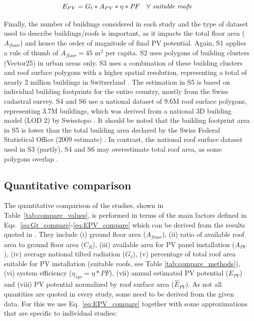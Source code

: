 \begin{equation}
\label{eq:EPV_compare}
    E_{PV} = G_t * A_{PV} * \eta * \mathit{PF} \quad \forall \ \text{\textit{suitable roofs}}
\end{equation}

Finally, the number of buildings considered in each study and the type of dataset used to describe buildings/roofs is important, as it impacts the total floor area ($A_{\mathit{floor}}$) and hence the order of magnitude of final PV potential. Again, S1 applies a rule of thumb of $A_{\mathit{floor}} = 45$ m$^2$ per capita. S2 uses polygons of building clusters (Vector25) in urban areas only. S3 uses a combination of these building clusters and roof surface polygons with a higher spatial resolution, representing a total of nearly 2 million buildings in Switzerland \cite{assouline_large-scale_2018}. The estimation in S5 is based on individual building footprints for the entire country, mostly from the Swiss cadastral survey. S4 and S6 use a national dataset of 9.6M roof surface polygons, representing 3.7M buildings, which was derived from a national 3D building model (LOD 2) by Swisstopo . It should be noted that the building footprint area in S5 is lower than the total building area declared by the Swiss Federal Statistical Office (2009 estimate) \cite{buffat_scalable_2018}. In contrast, the national roof surface dataset used in S3 (partly), S4 and S6 may overestimate total roof area, as some polygons overlap \cite{swisstopo_swisstlm3d_2018}.

\subsection{Quantitative comparison}


The quantitative comparison of the studies, shown in Table~\ref{tab:compare_values}, is performed in terms of the main factors defined in Eqs.~\ref{eq:Gt_compare}-\ref{eq:EPV_compare} which can be derived from the results quoted in \cite{iea_potential_2002,assouline_quantifying_2017,assouline_large-scale_2018,klauser_solarpotentialanalyse_2016,buffat_scalable_2018, walch_big_2020}. They include (i) ground floor area ($A_{\mathit{floor}}$), (ii) ratio of available roof area to ground floor area ($C_R$), (iii) available area for PV panel installation ($A_{PV}$), (iv) average national tilted radiation ($G_t$), (v) percentage of total roof area suitable for PV installation (suitable roofs, see Table \ref{tab:compare_methods}), (vi) system efficiency ($\eta_{sys} = \eta * \mathit{PF}$), (vii) annual estimated PV potential ($E_{PV}$) and (viii) PV potential normalized by roof surface area ($\hat{E}_{PV}$). As not all quantities are quoted in every study, some need to be derived from the given data. For this we use Eq.~\ref{eq:EPV_compare} together with some approximations that are specific to individual studies:


